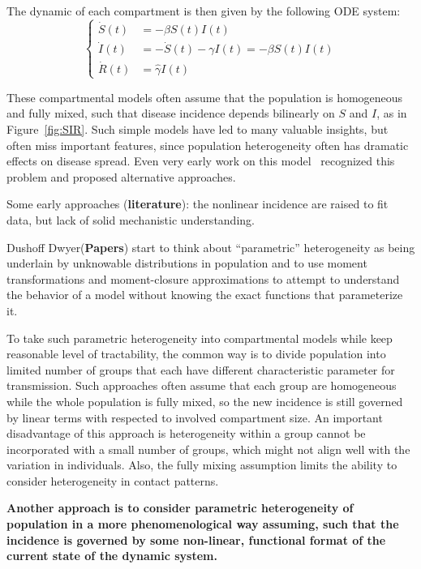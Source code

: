 \documentclass[12pt]{article}
\theoremstyle{plain}
\theoremstyle{definition}
\begin{document}
The dynamic of each compartment is then given by the following ODE system:
\begin{equation}
	\label{eqn: MASIR}
	\begin{cases}
		\dot{S}(t) & = -\beta S(t) I(t) \\
		\dot{I}(t) & = -\dot{S}(t)-\gamma I(t) = -\beta S(t) I(t) \\
		\dot{R}(t) & = \hat{\gamma} I(t) 
	\end{cases} 
\end{equation}

These compartmental models often assume that the population is homogeneous and fully mixed, such that disease incidence depends bilinearly on $S$ and $I$, as in Figure~\ref{fig:SIR}. 
Such simple models have led to many valuable insights, but often miss important features, since population heterogeneity often has dramatic effects on disease spread. 
Even very early work on this model~\cite{McKendrick:1940} recognized this problem and proposed alternative approaches. 

Some early approaches (\textbf{literature}): the nonlinear incidence are raised to fit data, but lack of solid mechanistic understanding.

Dushoff\cite{Dushoff:1999} Dwyer(\textbf{Papers}) start to think about “parametric” heterogeneity as being underlain by unknowable distributions in population and to use moment transformations and moment-closure approximations to attempt to understand the behavior of a model without knowing the exact functions that parameterize it.

To take such parametric heterogeneity into compartmental models while keep reasonable level of tractability, the common way is to divide population into limited number of groups that each have different characteristic parameter for transmission. 
Such approaches often assume that each group are homogeneous while the whole population is fully mixed, so the new incidence is still governed by linear terms with respected to involved compartment size.
An important disadvantage of this approach is heterogeneity within a group cannot be incorporated with a small number of groups\cite{Novozhilov:2008}, which might not align well with the variation in individuals.
Also, the fully mixing assumption limits the ability to consider heterogeneity in contact patterns.

\textbf{Another approach is to consider parametric heterogeneity of population in a more phenomenological way assuming, such that the incidence is governed by some non-linear, functional format of the current state of the dynamic system. }
\end{document}
